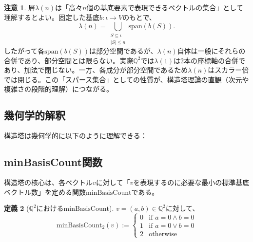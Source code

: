 \documentclass[a4paper,11pt]{ltjsarticle}
\theoremstyle{definition}
\newtheorem{definition}{定義}[section]
\newtheorem{remark}[definition]{注意}
\begin{document}
\begin{remark}
層$\lambda(n)$は「高々$n$個の基底要素で表現できるベクトルの集合」として理解するとよい。固定した基底$b : \iota \to V$のもとで、
\[
\lambda(n)=\bigcup_{\substack{S\subseteq \iota\\ |S|\le n}} \mathrm{span}(b(S)).
\]
したがって各$\mathrm{span}(b(S))$は部分空間であるが、$\lambda(n)$自体は一般にそれらの合併であり、部分空間とは限らない。実際$\mathbb{Q}^2$では$\lambda(1)$は2本の座標軸の合併であり、加法で閉じない。一方、各成分が部分空間であるため$\lambda(n)$はスカラー倍では閉じる。この「スパース集合」としての性質が、構造塔理論の直観（次元や複雑さの段階的理解）につながる。
\end{remark}

\subsection{幾何学的解釈}

構造塔は幾何学的に以下のように理解できる：

\begin{center}
\end{center}

\subsection{minBasisCount関数}

構造塔の核心は、各ベクトル$v$に対して「$v$を表現するのに必要な最小の標準基底ベクトル数」を定める関数$\mathrm{minBasisCount}$である。

\begin{definition}[$\mathbb{Q}^2$における$\mathrm{minBasisCount}$]\label{def:minBasisCount2}
$v = (a, b) \in \mathbb{Q}^2$に対して、
\[
\mathrm{minBasisCount}_2(v) := \begin{cases}
0 & \text{if } a = 0 \land b = 0 \\
1 & \text{if } a = 0 \lor b = 0 \\
2 & \text{otherwise}
\end{cases}
\]
\end{definition}
\end{document}
